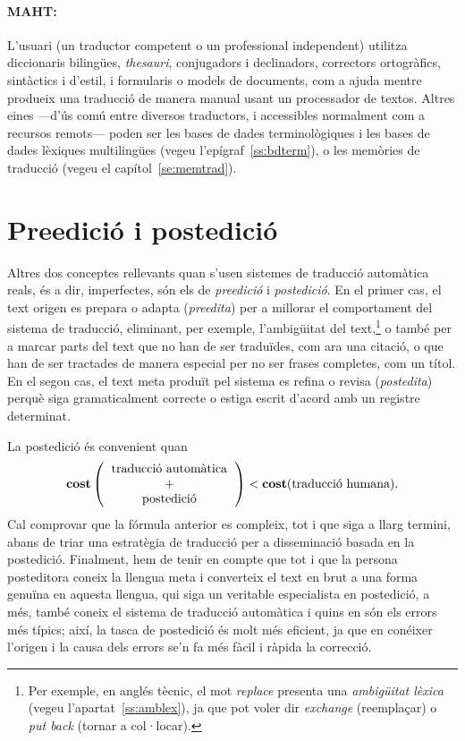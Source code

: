 \paragraph{MAHT:} L'usuari (un traductor competent o un professional
independent) utilitza diccionaris bilingües, \emph{thesauri}, 
conjugadors i
declinadors, correctors ortogràfics, sintàctics i d'estil, i
formularis o models de documents, com a ajuda mentre produeix una
traducció de manera manual usant un processador de textos. Altres
eines ---d'ús comú entre diversos traductors, i accessibles
normalment com a recursos remots--- poden ser les bases de dades
terminològiques  i les bases de dades lèxiques multilingües
(vegeu l'epígraf~\ref{ss:bdterm}), o les memòries de traducció (vegeu
el capítol~\ref{se:memtrad}).

\section{Preedició i postedició} 
\label{ss:preedposted}

Altres dos conceptes rellevants quan s'usen sistemes de traducció
automàtica reals, és a dir, imperfectes, són els de \emph{preedició} i
{\em postedició}.  En el primer cas, el text origen es prepara o
adapta (\emph{preedita}) per a millorar el comportament del sistema de
traducció, eliminant, per exemple, l'ambigüitat del text,\footnote{Per
  exemple, en anglés tècnic, el mot \emph{replace} presenta una {\em
    ambigüitat lèxica} (vegeu l'apartat~\ref{ss:amblex}), ja que pot
  voler dir \emph{exchange} (reemplaçar) o \emph{put back} (tornar a
  col·locar).} o també per a marcar parts del text que no han de ser
traduïdes, com ara una citació, o que han de ser tractades de manera
especial per no ser frases completes, com un títol.  En el segon cas,
el text meta produït pel sistema es refina o revisa ({\em postedita})
perquè siga gramaticalment correcte o estiga escrit d'acord amb un
registre determinat.

  La postedició és convenient quan
  $$\textbf{cost}\left(\mbox{\begin{tabular}{c}traducció automàtica\\ +\\
        postedició\end{tabular}}\right) <
  \textbf{cost}(\mbox{traducció humana}).
  $$
  \label{pg:cost}
  Cal comprovar que la fórmula anterior es compleix, tot i que siga
  a llarg termini, abans de triar una estratègia de traducció per a
  disseminació basada en la postedició.  Finalment, hem de tenir en
  compte que tot i que la persona posteditora coneix la llengua meta i
  converteix el text en brut a una forma genuïna en aquesta llengua,
  qui siga un veritable especialista en postedició, a més, també
  coneix el sistema de traducció automàtica i quins en són els errors
  més típics; així, la tasca de postedició és molt més eficient, ja
  que en conéixer l'origen i la causa dels errors se'n fa més fàcil i
  ràpida la correcció.

